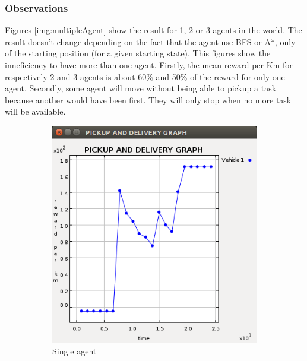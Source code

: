 \documentclass[11pt]{article}
\begin{document}
\subsubsection{Observations}
Figures \ref{img:multipleAgent} show the result for 1, 2 or 3 agents in the world. The result doesn't change depending on the fact that the agent use BFS or A*, only of the starting position (for a given starting state).
This figures show the inneficiency to have more than one agent. Firstly, the mean reward per Km for respectively 2 and 3 agents is about 60\% and 50\% of the reward for only one agent. Secondly, some agent will move without being able to pickup a task because another would have been first. They will only stop when no more task will be available.
\begin{figure}
  \begin{subfigure}[b]{0.3\textwidth}
    \includegraphics[width=\textwidth]{1agent.png}
    \caption{Single agent}
    \label{img:1agent}
  \end{subfigure}
  \begin{subfigure}[b]{0.3\textwidth}

\end{subfigure}
\end{figure}
\end{document}
